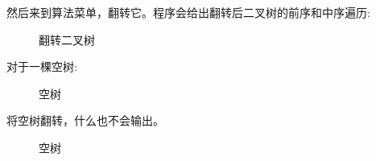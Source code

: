 \documentclass[supercite]{Experimental_Report}
\theoremstyle{definition}
\begin{document}
\noindent
然后来到算法菜单，翻转它。程序会给出翻转后二叉树的前序和中序遍历:
\begin{figure}[htbp]
	\centering
	\centering
	\caption{翻转二叉树}
	\label{fig5-71}
\end{figure}

\clearpage
\noindent
对于一棵空树:
\begin{figure}[htbp]
	\centering
	\centering
	\caption{空树}
	\label{fig5-72}
\end{figure}

\noindent
将空树翻转，什么也不会输出。
\begin{figure}[htbp]
	\centering
	\centering
	\caption{空树}
	\label{fig5-73}
\end{figure}
\end{document}
